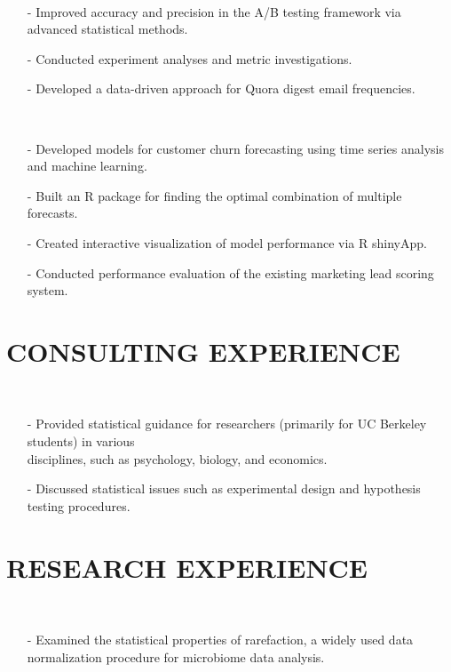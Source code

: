 \documentclass{res}
\begin{document}
\begin{resume}
     \\
    \begin{itemize}
     \item[-] Improved accuracy and precision in the A/B testing framework via advanced statistical methods.
     \item[-] Conducted experiment analyses and metric investigations.
     \item[-] Developed a data-driven approach for Quora digest email frequencies.
     \end{itemize}  
   
     \\
    \begin{itemize}
     \item[-] Developed models for customer churn forecasting using time series analysis and machine learning.
     \item[-] Built an R package for finding the optimal combination of multiple forecasts.
     \item[-] Created interactive visualization of model performance via R shinyApp.
     \item[-] Conducted performance evaluation of the existing marketing lead scoring system.
     \end{itemize}   

\section{CONSULTING EXPERIENCE}
     
     \\ 
    \begin{itemize}
     \item[-] Provided statistical guidance for researchers (primarily for UC Berkeley students) in various \\disciplines, such as psychology, biology, and economics.
     \item[-] Discussed statistical issues such as experimental design and hypothesis testing procedures.    
    \end{itemize}     

\section{RESEARCH EXPERIENCE}
     \\ 
\begin{itemize}
        \item[-] Examined the statistical properties of rarefaction, a widely used data normalization procedure for microbiome data analysis.
        \end{itemize}
        

\end{resume}
\end{document}
